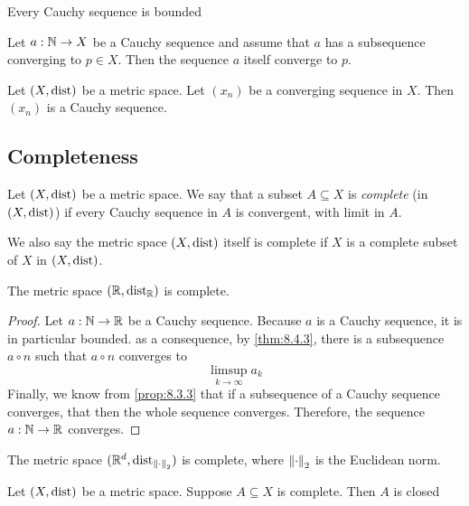 \begin{proposition}
    Every Cauchy sequence is bounded
\end{proposition}

\begin{proposition}
    \label{prop:8.3.3}
    Let $a: \mathbb{N} \to X$ be a Cauchy sequence and assume that $a$ has a subsequence converging to $p \in X$. Then the sequence
    $a$ itself converge to $p$.
\end{proposition}

\begin{proposition}
    Let $(X, \text{dist})$ be a metric space. Let $(x_n)$ be a converging sequence in $X$. Then $(x_n)$ is a Cauchy sequence.
\end{proposition}

\subsection{Completeness}
\begin{definition}
    Let $(X, \text{dist})$ be a metric space. We say that a subset $A \subseteq X$ is \emph{complete} (in $(X, \text{dist})$) if every
    Cauchy sequence in $A$ is convergent, with limit in $A$.

    We also say the metric space $(X, \text{dist})$ itself is complete if $X$ is a complete subset of $X$ in $(X,\text{dist})$.
\end{definition}

\begin{theorem}
    The metric space $(\mathbb{R}, \text{dist}_{\mathbb{R}})$ is complete.
\end{theorem}
\begin{proof}
    Let $a:\mathbb{N}\to\mathbb{R}$ be a Cauchy sequence. Because $a$ is a Cauchy sequence, it is in particular bounded. as a consequence, by
    \cref{thm:8.4.3}, there is a subsequence $a \circ n$ such that $a \circ n$ converges to 
    $$\limsup_{k\to\infty}a_k$$
    Finally, we know from \cref{prop:8.3.3} that if a subsequence of a Cauchy sequence converges, that then the whole
    sequence converges. Therefore, the sequence $a: \mathbb{N} \to \mathbb{R}$ converges.
\end{proof}

\begin{proposition}
    The metric space $(\mathbb{R}^d, \text{dist}_{\norm{\cdot}_2})$ is complete, where $\norm{\cdot}_2$ is the Euclidean norm.
\end{proposition}

\begin{proposition}
    Let $(X, \text{dist})$ be a metric space. Suppose $A \subseteq X$ is complete. Then $A$ is closed
\end{proposition}


